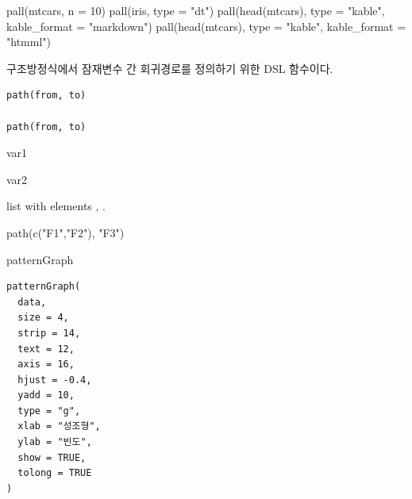 \documentclass[a4paper]{book}
\begin{document}
%
\begin{Examples}
\begin{ExampleCode}
pall(mtcars, n = 10)
pall(iris, type = "dt")
pall(head(mtcars), type = "kable", kable_format = "markdown")
pall(head(mtcars), type = "kable", kable_format = "htmml")

\end{ExampleCode}
\end{Examples}
%
\begin{Description}
구조방정식에서 잠재변수 간 회귀경로를 정의하기 위한 DSL 함수이다.
\end{Description}
%
\begin{Usage}
\begin{verbatim}
path(from, to)

path(from, to)
\end{verbatim}
\end{Usage}
%
\begin{Arguments}
\begin{ldescription}
\item[\code{from}] var1

\item[\code{to}] var2
\end{ldescription}
\end{Arguments}
%
\begin{Value}
list with elements , .
\end{Value}
%
\begin{Examples}
\begin{ExampleCode}
path(c("F1","F2"), "F3")
\end{ExampleCode}
\end{Examples}
%
\begin{Description}
patternGraph
\end{Description}
%
\begin{Usage}
\begin{verbatim}
patternGraph(
  data,
  size = 4,
  strip = 14,
  text = 12,
  axis = 16,
  hjust = -0.4,
  yadd = 10,
  type = "g",
  xlab = "성조형",
  ylab = "빈도",
  show = TRUE,
  tolong = TRUE
)
\end{verbatim}
\end{Usage}
%
\end{document}
